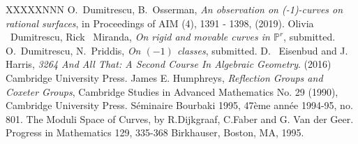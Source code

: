 \documentclass[12pt]{article}
\numberwithin{equation}{section}
\numberwithin{equation}{section}
\numberwithin{subeq}{equation}
\def\bbP{\mathbb{P}}
\begin{document}
\begin{thebibliography}{XXXXXNNN}
 O.~Dumitrescu, B.~Osserman, {\it  An observation on (-1)-curves on rational surfaces}, in Proceedings of AIM (4), 1391 - 1398, (2019).
 Olivia ~Dumitrescu, Rick ~Miranda, \emph{On rigid and movable curves in $\bbP^r$}, submitted.
 O.~Dumitrescu, N.~Priddis, {\it  On $(-1)$ classes}, submitted.
 D. ~Eisenbud and J.~ Harris, \emph{3264 And All That: A Second Course In Algebraic Geometry}. (2016) Cambridge University Press.
 James E. Humphreys, {\it  Reflection Groups and Coxeter Groups},  Cambridge Studies in Advanced Mathematics No. 29 (1990), Cambridge University Press.
S\'eminaire Bourbaki 1995, 47\`eme ann\'ee 1994-95, no. 801.
The Moduli Space of Curves, by R.Dijkgraaf, C.Faber and G. Van der Geer. Progress in Mathematics 129, 335-368  Birkhauser, Boston, MA, 1995.



\end{thebibliography}
\end{document}
